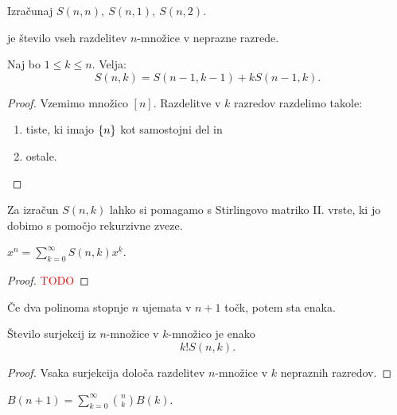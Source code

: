 \begin{primer}
    Izračunaj $S(n, n), \ S(n, 1), \ S(n,2)$.
\end{primer}

\begin{definicija}
     je število vseh razdelitev $n$-množice v neprazne razrede.
\end{definicija}

\begin{trditev}
    Naj bo $1 \leq k \leq n$. Velja:
    $$S(n,k) = S(n-1, k-1) + k S(n-1, k).$$
\end{trditev}

\begin{proof}
    Vzemimo množico $[n]$. Razdelitve v $k$ razredov razdelimo takole:
    \begin{enumerate}
        \item tiste, ki imajo $\left\{n\right\}$ kot samostojni del in
        \item ostale.
    \end{enumerate}
\end{proof}

Za izračun $S(n,k)$ lahko si pomagamo s Stirlingovo matriko II. vrste, ki jo dobimo s pomočjo rekurzivne zveze.

\begin{trditev}
    $x^n=\sum_{k=0}^{\infty} S(n,k) x^{\underline{k}}$.
\end{trditev}

\begin{proof}
    \textcolor{red}{TODO}
\end{proof}

\begin{opomba}
    Če dva polinoma stopnje $n$ ujemata v $n+1$ točk, potem sta enaka.
\end{opomba}

\begin{izrek}
    Število surjekcij iz $n$-množice v $k$-množico je enako 
    $$k! S(n,k).$$
\end{izrek}

\begin{proof}
    Vsaka surjekcija določa razdelitev $n$-množice v $k$ nepraznih razredov.
\end{proof}

\begin{trditev}
    $B(n+1) = \sum_{k=0}^{\infty} \binom{n}{k} B(k)$.
\end{trditev}

